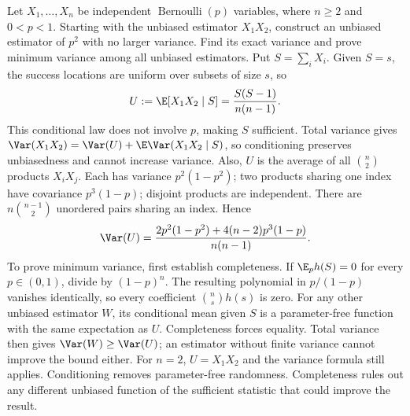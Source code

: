 Let $X_1,\ldots,X_n$ be independent $\operatorname{Bernoulli}(p)$ variables, where $n\ge2$ and $0<p<1$. Starting with the unbiased estimator $X_1X_2$, construct an unbiased estimator of $p^2$ with no larger variance. Find its exact variance and prove minimum variance among all unbiased estimators.
\solution Put $S=\sum_iX_i$. Given $S=s$, the success locations are uniform over subsets of size $s$, so
\[
 U:=\E[X_1X_2\mid S]=\frac{S(S-1)}{n(n-1)}.
\]
This conditional law does not involve $p$, making $S$ sufficient. Total variance gives $\Var(X_1X_2)=\Var(U)+\E\Var(X_1X_2\mid S)$, so conditioning preserves unbiasedness and cannot increase variance.
Also, $U$ is the average of all $\binom n2$ products $X_iX_j$. Each has variance $p^2(1-p^2)$; two products sharing one index have covariance $p^3(1-p)$; disjoint products are independent. There are $n\binom{n-1}{2}$ unordered pairs sharing an index. Hence
\[
 \Var(U)=\frac{2p^2(1-p^2)+4(n-2)p^3(1-p)}{n(n-1)}.
\]
To prove minimum variance, first establish completeness. If $\E_p h(S)=0$ for every $p\in(0,1)$, divide by $(1-p)^n$. The resulting polynomial in $p/(1-p)$ vanishes identically, so every coefficient $\binom ns h(s)$ is zero.
For any other unbiased estimator $W$, its conditional mean given $S$ is a parameter-free function with the same expectation as $U$. Completeness forces equality. Total variance then gives $\Var(W)\ge\Var(U)$; an estimator without finite variance cannot improve the bound either. For $n=2$, $U=X_1X_2$ and the variance formula still applies.
\insight Conditioning removes parameter-free randomness. Completeness rules out any different unbiased function of the sufficient statistic that could improve the result.

